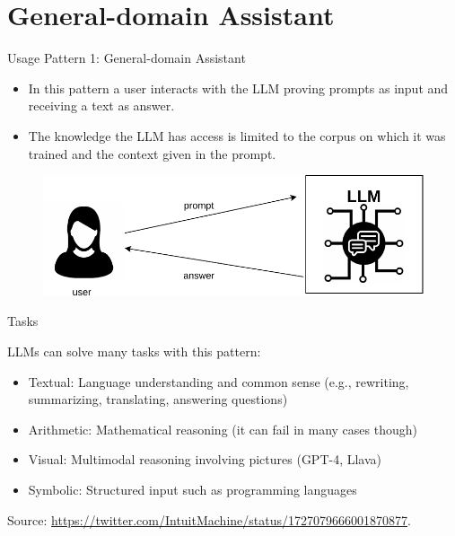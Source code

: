 \documentclass[handout]{beamer}
\begin{document}

\section{General-domain Assistant}

\begin{frame}{Usage Pattern 1: General-domain Assistant}
\begin{scriptsize}
\begin{itemize}
\item In this pattern a user interacts with the LLM proving prompts as input and receiving a text as answer.
\item The knowledge the LLM has access is limited to the corpus on which it was trained and the context given in the prompt.
\end{itemize}

 \begin{figure}[h]
        	\includegraphics[scale = 0.6]{pics/assistantpattern.pdf}
        \end{figure}  


\end{scriptsize}
\end{frame}


\begin{frame}{Tasks}
\begin{scriptsize}
LLMs can solve many tasks with this pattern:

\begin{itemize}
\item Textual: Language understanding and common sense (e.g., rewriting, summarizing, translating, answering questions)
\item Arithmetic: Mathematical reasoning  (it can fail in many cases though)
\item Visual: Multimodal reasoning involving pictures (GPT-4, Llava)
\item Symbolic: Structured input such as programming languages
\end{itemize}
Source: \url{https://twitter.com/IntuitMachine/status/1727079666001870877}.
\end{scriptsize}
\end{frame}
\end{document}
